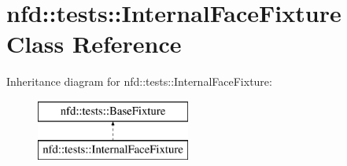 \hypertarget{classnfd_1_1tests_1_1InternalFaceFixture}{}\section{nfd\+:\+:tests\+:\+:Internal\+Face\+Fixture Class Reference}
\label{classnfd_1_1tests_1_1InternalFaceFixture}
Inheritance diagram for nfd\+:\+:tests\+:\+:Internal\+Face\+Fixture\+:\begin{figure}[H]
\begin{center}
\leavevmode
\includegraphics[height=2.000000cm]{classnfd_1_1tests_1_1InternalFaceFixture}
\end{center}
\end{figure}

